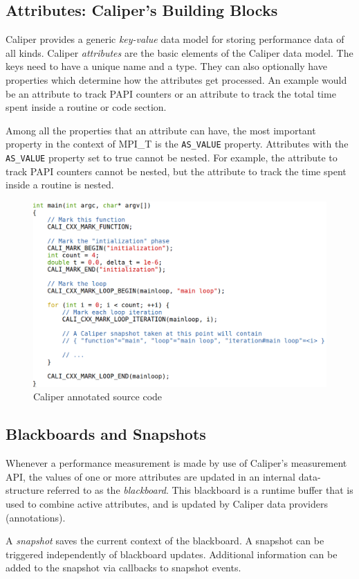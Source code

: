 \subsection{Attributes: Caliper's Building Blocks}
Caliper provides a generic \textit{key-value} data model for storing performance data of all kinds. Caliper \textit{attributes} are the basic elements of the Caliper data model. The keys need to have a unique name and a type. They can also optionally have properties which determine how the attributes get processed. An example would be an attribute to track PAPI counters or an attribute to track the total time spent inside a routine or code section. 
\par Among all the properties that an attribute can have, the most important property in the context of MPI\_T is the \verb+AS_VALUE+ property. Attributes with the \verb+AS_VALUE+ property set to true cannot be nested. For example, the attribute to track PAPI counters cannot be nested, but the attribute to track the time spent inside a routine is nested.
\begin{center}
	\begin{figure}[tbp!]
         \centering
  \captionsetup{justification=centering}
		\includegraphics[scale=0.3, width=\columnwidth, keepaspectratio]{figures/cali-example}
		\caption{Caliper annotated source code}
		\label{fig:caliexample}
	\end{figure}
\end{center}

\subsection{Blackboards and Snapshots}
Whenever a performance measurement is made by use of Caliper's measurement API, the values of one or more attributes are updated in an internal data-structure referred to as the \textit{blackboard}. This blackboard is a runtime buffer that is used to combine active attributes, and is updated by Caliper data providers (annotations).
\par A \textit{snapshot} saves the current context of the blackboard. A snapshot can be triggered independently of blackboard updates. Additional information can be added to the snapshot via callbacks to snapshot events. 
